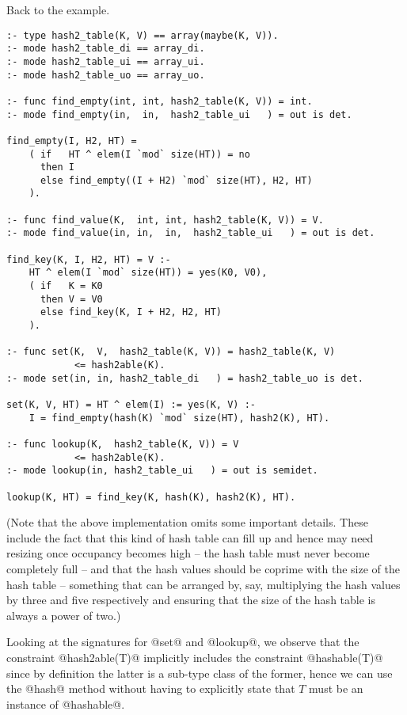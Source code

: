 Back to the example.
\begin{verbatim}
:- type hash2_table(K, V) == array(maybe(K, V)).
:- mode hash2_table_di == array_di.
:- mode hash2_table_ui == array_ui.
:- mode hash2_table_uo == array_uo.

:- func find_empty(int, int, hash2_table(K, V)) = int.
:- mode find_empty(in,  in,  hash2_table_ui   ) = out is det.

find_empty(I, H2, HT) =
    ( if   HT ^ elem(I `mod` size(HT)) = no
      then I
      else find_empty((I + H2) `mod` size(HT), H2, HT)
    ).

:- func find_value(K,  int, int, hash2_table(K, V)) = V.
:- mode find_value(in, in,  in,  hash2_table_ui   ) = out is det.

find_key(K, I, H2, HT) = V :-
    HT ^ elem(I `mod` size(HT)) = yes(K0, V0),
    ( if   K = K0
      then V = V0
      else find_key(K, I + H2, H2, HT)
    ).

:- func set(K,  V,  hash2_table(K, V)) = hash2_table(K, V)
            <= hash2able(K).
:- mode set(in, in, hash2_table_di   ) = hash2_table_uo is det.

set(K, V, HT) = HT ^ elem(I) := yes(K, V) :-
    I = find_empty(hash(K) `mod` size(HT), hash2(K), HT).

:- func lookup(K,  hash2_table(K, V)) = V
            <= hash2able(K).
:- mode lookup(in, hash2_table_ui   ) = out is semidet.

lookup(K, HT) = find_key(K, hash(K), hash2(K), HT).
\end{verbatim}
(Note that the above implementation omits some important details.  These
include the fact that this kind of hash table can fill up and hence may
need resizing once occupancy becomes high -- the hash table must never
become completely full -- and that the hash values should be coprime
with the size of the hash table -- something that can be arranged by,
say, multiplying the hash values by three and five respectively and
ensuring that the size of the hash table is always a power of two.)

Looking at the signatures for @set@ and @lookup@, we observe that the
constraint @hash2able(T)@ implicitly includes the constraint
@hashable(T)@ since by definition the latter is a sub-type class of the
former, hence we can use the @hash@ method without having to explicitly
state that $T$ must be an instance of @hashable@.

